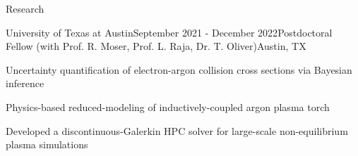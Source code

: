 \documentclass{resume} %
\begin{document}
\begin{rSection}{Research}
\begin{rSubsection}{University of Texas at Austin}{September 2021 - December 2022}{Postdoctoral Fellow \textnormal{(with Prof. R. Moser, Prof. L. Raja, Dr. T. Oliver)}}{Austin, TX}
\item Uncertainty quantification of electron-argon collision cross sections via Bayesian inference
\item Physics-based reduced-modeling of inductively-coupled argon plasma torch
\item Developed a discontinuous-Galerkin HPC solver for large-scale non-equilibrium plasma simulations
\end{rSubsection}


\end{rSection}
\end{document}
